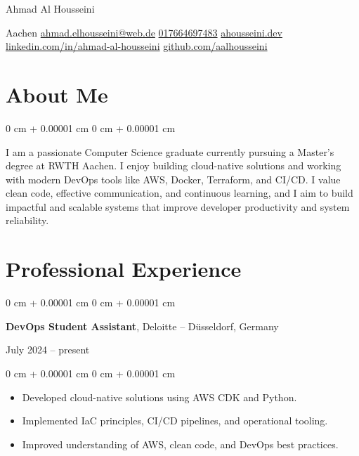 \documentclass[10pt, letterpaper]{article}
\newenvironment{highlights}{
    \begin{itemize}[
        topsep=0.10 cm,
        parsep=0.10 cm,
        partopsep=0pt,
        itemsep=0pt,
        leftmargin=0 cm + 10pt
    ]
}{
    \end{itemize}
} %
\newenvironment{onecolentry}{
    \begin{adjustwidth}{
        0 cm + 0.00001 cm
    }{
        0 cm + 0.00001 cm
    }
}{
    \end{adjustwidth}
} %
\newenvironment{twocolentry}[2][]{
    \onecolentry
    \def\secondColumn{#2}
    \setcolumnwidth{\fill, 4.5 cm}
    \begin{paracol}{2}
}{
    \switchcolumn \raggedleft \secondColumn
    \end{paracol}
    \endonecolentry
} %
\newenvironment{header}{
    \setlength{\topsep}{0pt}\par\kern\topsep\centering\linespread{1.5}
}{
    \par\kern\topsep
} %
\begin{document}
    \newcommand{\AND}{\unskip
        \cleaders\copy\ANDbox\hskip\wd\ANDbox
        \ignorespaces
    }
    \newsavebox\ANDbox
    \sbox\ANDbox{$|$}

\begin{header}
    \fontsize{25 pt}{25 pt}\selectfont Ahmad Al Housseini

    \vspace{5 pt}

    \normalsize
    Aachen%
    \kern 5pt%
    \textbar\kern 5pt%
    \href{mailto:ahmad.elhousseini@web.de}{ahmad.elhousseini@web.de}%
    \kern 5pt%
    \textbar\kern 5pt%
    \href{tel:+4917664697483}{017664697483}%
    \kern 5pt%
    \textbar\kern 5pt%
    \href{https://ahousseini.dev/}{ahousseini.dev}%
    \kern 5pt%
    \textbar\kern 5pt%
    \href{https://linkedin.com/in/ahmad-al-housseini/}{linkedin.com/in/ahmad-al-housseini}%
    \kern 5pt%
    \textbar\kern 5pt%
    \href{https://github.com/aalhousseini}{github.com/aalhousseini}
\end{header}


    \vspace{5 pt - 0.3 cm}


\section{About Me}

\begin{onecolentry}
I am a passionate Computer Science graduate currently pursuing a Master's degree at RWTH Aachen. I enjoy building cloud-native solutions and working with modern DevOps tools like AWS, Docker, Terraform, and CI/CD. I value clean code, effective communication, and continuous learning, and I aim to build impactful and scalable systems that improve developer productivity and system reliability.
\end{onecolentry}
    

    \section{Professional Experience}

 \begin{twocolentry}{
            July 2024 – present
        }
\textbf{DevOps Student Assistant}, Deloitte -- Düsseldorf, Germany
\end{twocolentry}
\begin{onecolentry}
\begin{highlights}
\item Developed cloud-native solutions using AWS CDK and Python.
\item Implemented IaC principles, CI/CD pipelines, and operational tooling.
\item Improved understanding of AWS, clean code, and DevOps best practices.
\end{highlights}
\end{onecolentry}
\end{document}
